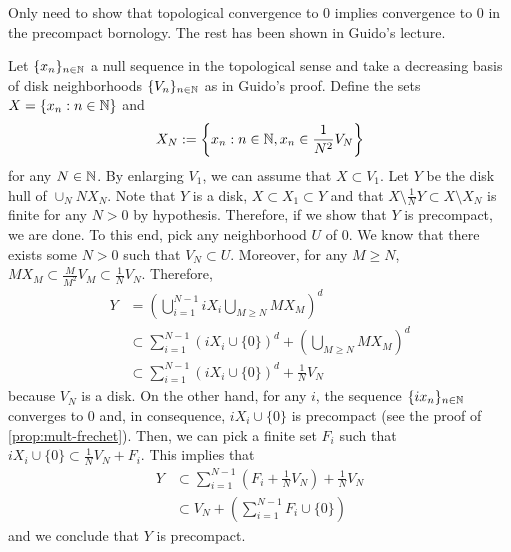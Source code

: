 \begin{solution}
    Only need to show that topological convergence to $0$ implies convergence to $0$ in the precompact bornology. The rest has been shown in Guido's lecture.

    Let $\{x_n\}_{n\in\mathbb N}$ a null sequence in the topological sense and take a decreasing basis of disk neighborhoods $\{V_n\}_{n\in\mathbb N}$ as in Guido's proof. Define the sets $X=\{x_n:n\in\mathbb N\}$ and
    \[X_N:=\left\{x_n:n\in\mathbb N, x_n\in\frac{1}{N^2}V_N\right\}\]
    for any $N\in\mathbb N$. By enlarging $V_1$, we can assume that $X\subset V_1$. Let $Y$ be the disk hull of $\cup_N NX_N$. Note that $Y$ is a disk, $X\subset X_1\subset Y$ and that $X\setminus\frac{1}{N}Y\subset X\setminus X_N$ is finite
    for any $N>0$ by hypothesis. Therefore, if we show that $Y$ is precompact, we are done. To this end, pick any neighborhood $U$ of $0$. We know that there exists some $N>0$ such that $V_N\subset U$. Moreover, for any $M\geq N$, $MX_M\subset \frac{M}{M^2}V_M\subset \frac{1}{N}V_N$. Therefore,
    \begin{align*}
        Y&= \left(\bigcup_{i=1}^{N-1} iX_i \bigcup_{M\geq N} MX_M\right)^d\\
        &\subset \sum_{i=1}^{N-1} (iX_i\cup\{0\})^d + \left(\bigcup_{M\geq N} MX_M\right)^d\\
        &\subset \sum_{i=1}^{N-1} (iX_i\cup\{0\})^d + \frac{1}{N}V_N
    \end{align*}
    because $V_N$ is a disk.
    On the other hand, for any $i$, the sequence $\{ix_n\}_{n\in\mathbb N}$ converges to $0$ and, in consequence, $iX_i\cup\{0\}$ is precompact (see the proof of \ref{prop:mult-frechet}). Then, we can pick a finite set $F_i$ such that $iX_i\cup\{0\}\subset \frac{1}{N}V_N + F_i$. This implies that
    \begin{align*}
        Y&\subset \sum_{i=1}^{N-1} (F_i+ \frac{1}{N}V_N) + \frac{1}{N}V_N\\
        &\subset V_N + \left(\sum_{i=1}^{N-1} F_i\cup\{0\}\right)    
    \end{align*}
    and we conclude that $Y$ is precompact.
\end{solution}

